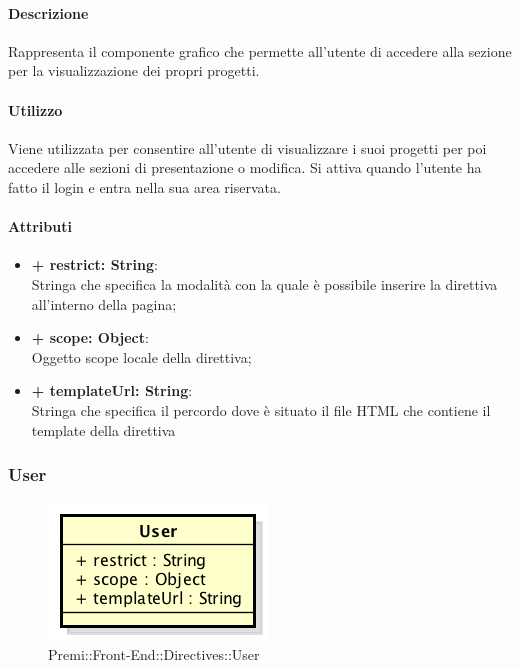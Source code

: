 	\paragraph{Descrizione}
	Rappresenta il componente grafico che permette all'utente di accedere alla sezione per la visualizzazione dei propri progetti.
	
	\paragraph{Utilizzo}
	Viene utilizzata per consentire all'utente di visualizzare i suoi progetti per poi accedere alle sezioni di presentazione o modifica. Si attiva quando l'utente ha fatto il login e entra nella sua area riservata.
	
	\paragraph{Attributi}
	\begin{itemize}
		\item \textbf{+ restrict: String}:\\
		Stringa che specifica la modalità con la quale è possibile inserire la direttiva all'interno della pagina;
		\item \textbf{+ scope: Object}:\\
		Oggetto scope locale della direttiva;
		\item \textbf{+ templateUrl: String}:\\
		Stringa che specifica il percordo dove è situato il file HTML che contiene il template della direttiva
	\end{itemize}
\newpage


\subsubsection{User}
	\begin{figure}[h]
		\centering
		\includegraphics[width=0.5\linewidth]{img/premi_front_end_directives_user}
		\caption[Premi::Front-End::Directives::User]{Premi::Front-End::Directives::User}
	\end{figure}
	

